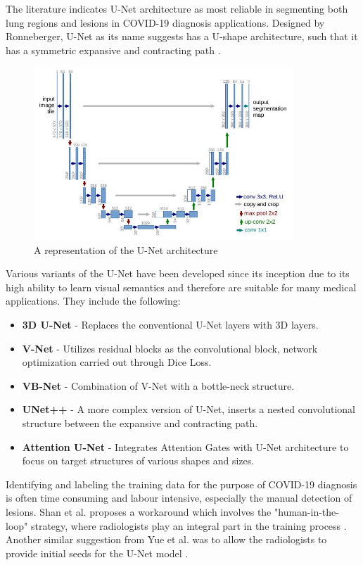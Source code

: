 The literature indicates U-Net architecture as most reliable in segmenting both lung regions and lesions in COVID-19 diagnosis 
applications. Designed by Ronneberger, U-Net as its name suggests has a U-shape architecture, 
such that it has a symmetric expansive and contracting path \cite{RFT2015}.

\begin{figure}[H]
    \centering
    \includegraphics[height=6.5cm]{Images/UNet.JPG}
    \caption[U-Net Architecture]{A representation of the U-Net architecture \cite{RFT2015}}
    \label{fig:U-Net Architecture}
    \end{figure}
\vspace{-2em}
Various variants of the U-Net have been developed since its inception due to its high ability to learn visual semantics and therefore are suitable 
for many medical applications. They include the following:
\begin{itemize}
    \item \textbf{3D U-Net} - Replaces the conventional U-Net layers with 3D layers. \cite{SCS+2020}
    \item \textbf{V-Net} - Utilizes residual blocks as the convolutional block, network optimization carried out through Dice Loss. \cite{MNA+2020}
    \item \textbf{VB-Net} - Combination of V-Net with a bottle-neck structure. \cite{SFY+2020}
    \item \textbf{UNet++} - A more complex version of U-Net, inserts a nested convolutional structure between the expansive and contracting path. \cite{ZSM+2020}
    \item \textbf{Attention U-Net} - Integrates Attention Gates with U-Net architecture to focus on target structures of various shapes and sizes. \cite{OSF+2020}
\end{itemize}

Identifying and labeling the training data for the purpose of COVID-19 diagnosis is often 
time consuming and labour intensive, especially the manual detection of lesions. Shan et al. proposes a workaround which involves the "human-in-the-loop" strategy, 
where radiologists play an integral part in the training process \cite{SFY+2020}. Another similar suggestion from Yue et al. was to allow the radiologists to provide initial seeds for the U-Net  model \cite{YHQ+2020}.

